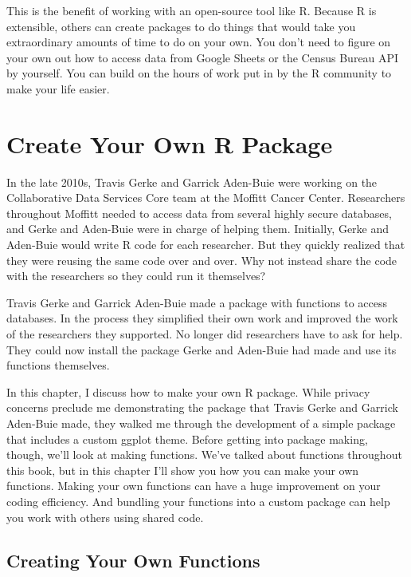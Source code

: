 \documentclass[
]{book}
\begin{document}
This is the benefit of working with an open-source tool like R. Because R is extensible, others can create packages to do things that would take you extraordinary amounts of time to do on your own. You don't need to figure on your own out how to access data from Google Sheets or the Census Bureau API by yourself. You can build on the hours of work put in by the R community to make your life easier.

\hypertarget{packages-chapter}{%
\chapter{Create Your Own R Package}\label{packages-chapter}}

In the late 2010s, Travis Gerke and Garrick Aden-Buie were working on the Collaborative Data Services Core team at the Moffitt Cancer Center. Researchers throughout Moffitt needed to access data from several highly secure databases, and Gerke and Aden-Buie were in charge of helping them. Initially, Gerke and Aden-Buie would write R code for each researcher. But they quickly realized that they were reusing the same code over and over. Why not instead share the code with the researchers so they could run it themselves?

Travis Gerke and Garrick Aden-Buie made a package with functions to access databases. In the process they simplified their own work and improved the work of the researchers they supported. No longer did researchers have to ask for help. They could now install the package Gerke and Aden-Buie had made and use its functions themselves.

In this chapter, I discuss how to make your own R package. While privacy concerns preclude me demonstrating the package that Travis Gerke and Garrick Aden-Buie made, they walked me through the development of a simple package that includes a custom ggplot theme. Before getting into package making, though, we'll look at making functions. We've talked about functions throughout this book, but in this chapter I'll show you how you can make your own functions. Making your own functions can have a huge improvement on your coding efficiency. And bundling your functions into a custom package can help you work with others using shared code.

\hypertarget{creating-your-own-functions}{%
\section*{Creating Your Own Functions}\label{creating-your-own-functions}}
\end{document}
